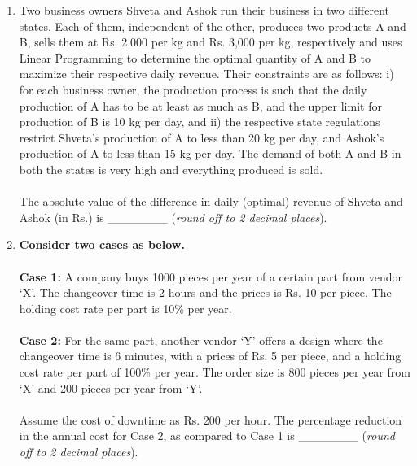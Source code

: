 \documentclass[12pt,onecolumn]{article}
\begin{document}
\begin{enumerate}
    \item Two business owners Shveta and Ashok run their business in two different states. Each of them, independent of the other, produces two products A and B, sells them at Rs. 2,000 per kg and Rs. 3,000 per kg, respectively and uses Linear Programming to determine the optimal quantity of A and B to maximize their respective daily revenue. Their constraints are as follows: i) for each business owner, the production process is such that the daily production of A has to be at least as much as B, and the upper limit for production of B is 10 kg per day, and ii) the respective state regulations restrict Shveta's production of A to less than 20 kg per day, and Ashok's production of A to less than 15 kg per day. The demand of both A and B in both the states is very high and everything produced is sold.\\\\
          The absolute value of the difference in daily (optimal) revenue of Shveta and Ashok (in Rs.) is \_\_\_\_\_\_\_ (\textit{round off to 2 decimal places}).

    \item \textbf{Consider two cases as below.}\\\\
          \textbf{Case 1:} A company buys 1000 pieces per year of a certain part from vendor `X'. The changeover time is 2 hours and the prices is Rs. 10 per piece. The holding cost rate per part is 10\% per year.\\\\
          \textbf{Case 2:} For the same part, another vendor `Y' offers a design where the changeover time is 6 minutes, with a prices of Rs. 5 per piece, and a holding cost rate per part of 100\% per year. The order size is 800 pieces per year from `X' and 200 pieces per year from `Y'.\\\\
          Assume the cost of downtime as Rs. 200 per hour. The percentage reduction in the annual cost for Case 2, as compared to Case 1 is \_\_\_\_\_\_\_ (\textit{round off to 2 decimal places}).


\end{enumerate}
\end{document}
